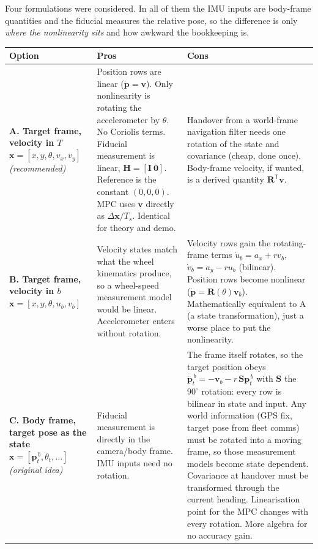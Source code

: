 \documentclass[11pt,a4paper]{article}
\newcommand{\vect}[1]{\bm{#1}}
\newcommand{\mat}[1]{\bm{#1}}
\newcommand{\T}{^{\mathsf{T}}}
\newcommand{\Rot}{\mat{R}}
\newcommand{\Ts}{T_s}
\begin{document}
Four formulations were considered. In all of them the IMU inputs are body-frame quantities and the fiducial measures the relative pose, so the difference is only \emph{where the nonlinearity sits} and how awkward the bookkeeping is.

\begin{table}[H]
\centering
\small
\renewcommand{\arraystretch}{1.25}
\begin{tabularx}{\linewidth}{>{\raggedright\arraybackslash}p{2.7cm} X X}
\toprule
Option & Pros & Cons \\
\midrule
\textbf{A. Target frame, velocity in $T$} \newline
$\vect{x}=[x,y,\theta,v_x,v_y]$ \newline
\emph{(recommended)} &
Position rows are linear ($\dot{\vect p}=\vect v$). Only nonlinearity is rotating the accelerometer by $\theta$. No Coriolis terms. Fiducial measurement is linear, $\mat H=[\mat I\ \mat 0]$. Reference is the constant $(0,0,0)$. MPC uses $\vect v$ directly as $\Delta\vect{x}/\Ts$. Identical for theory and demo. &
Handover from a world-frame navigation filter needs one rotation of the state and covariance (cheap, done once). Body-frame velocity, if wanted, is a derived quantity $\Rot\T\vect v$. \\
\midrule
\textbf{B. Target frame, velocity in $b$} \newline
$\vect{x}=[x,y,\theta,u_b,v_b]$ &
Velocity states match what the wheel kinematics produce, so a wheel-speed measurement model would be linear. Accelerometer enters without rotation. &
Velocity rows gain the rotating-frame terms $\dot u_b = a_x + r v_b$, $\dot v_b = a_y - r u_b$ (bilinear). Position rows become nonlinear ($\dot{\vect p}=\Rot(\theta)\vect v_b$). Mathematically equivalent to A (a state transformation), just a worse place to put the nonlinearity. \\
\midrule
\textbf{C. Body frame, target pose as the state} \newline
$\vect{x}=[\vect{p}_t^{\,b},\theta_t,\ldots]$ \newline
\emph{(original idea)} &
Fiducial measurement is directly in the camera/body frame. IMU inputs need no rotation. &
The frame itself rotates, so the target position obeys $\dot{\vect p}_t^{\,b} = -\vect v_b - r\,\mat S\vect p_t^{\,b}$ with $\mat S$ the $90^\circ$ rotation: every row is bilinear in state and input. Any world information (GPS fix, target pose from fleet comms) must be rotated into a moving frame, so those measurement models become state dependent. Covariance at handover must be transformed through the current heading. Linearisation point for the MPC changes with every rotation. More algebra for no accuracy gain. \\

\end{tabularx}
\end{table}
\end{document}
